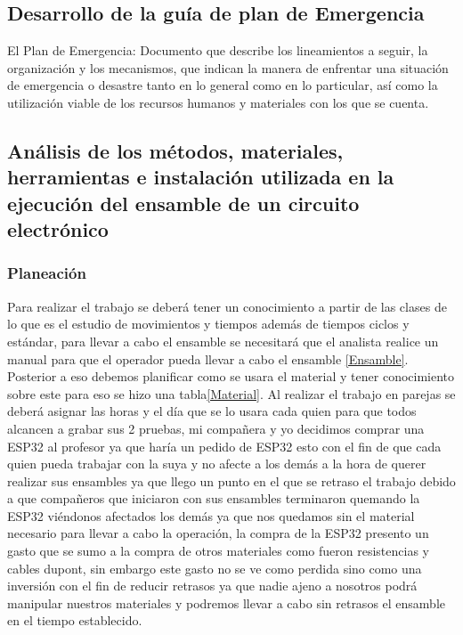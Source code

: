     \subsection{Desarrollo de la guía de plan de Emergencia}
    
    El Plan de Emergencia: Documento que describe los lineamientos a seguir, la organización y los mecanismos, que indican la manera de enfrentar una situación de emergencia o desastre tanto en lo general como en lo particular, así como la utilización viable de los recursos humanos y materiales con los que se cuenta.
    \subsection{Análisis de los métodos, materiales, herramientas e instalación utilizada en la ejecución del ensamble de un circuito electrónico}
    
    \subsubsection{Planeación}
    Para realizar el trabajo se deberá tener un conocimiento a partir de las clases de lo que es el estudio de movimientos y tiempos además de tiempos ciclos y estándar, para llevar a cabo el ensamble se necesitará que el analista realice un manual para que el operador pueda llevar a cabo el ensamble \ref{Ensamble}.
    Posterior a eso debemos planificar como se usara el material y tener conocimiento sobre este para eso se hizo una tabla\ref{Material}.
    Al realizar el trabajo en parejas se deberá asignar las horas y el día que se lo usara cada quien para que todos alcancen a grabar sus 2 pruebas, mi compañera y yo decidimos comprar una ESP32 al profesor ya que haría un pedido de ESP32 esto con el fin de que cada quien pueda trabajar con la suya y no afecte a los demás a la hora de querer realizar sus ensambles ya que llego un punto en el que se retraso el trabajo debido a que compañeros que iniciaron con sus ensambles terminaron quemando la ESP32 viéndonos afectados los demás ya que nos quedamos sin el material necesario para llevar a cabo la operación, la compra de la ESP32 presento un gasto que se sumo a la compra de otros materiales como fueron resistencias y cables dupont, sin embargo este gasto no se ve como perdida sino como una inversión con el fin de reducir retrasos ya que nadie ajeno a nosotros podrá manipular nuestros materiales y podremos llevar a cabo sin retrasos el ensamble  en el tiempo establecido.
